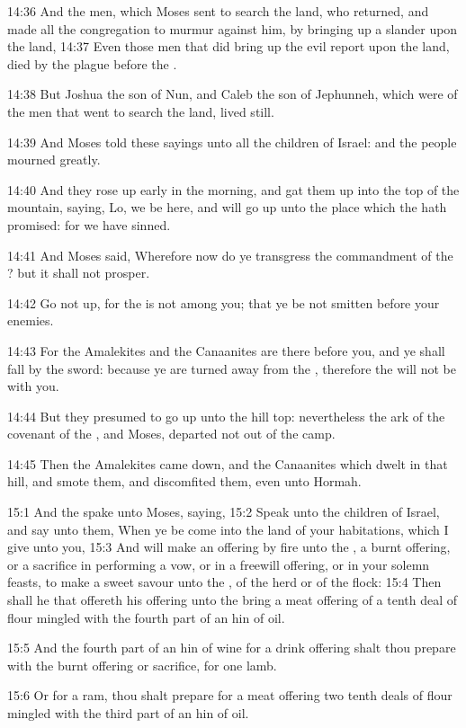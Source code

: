 14:36 And the men, which Moses sent to search the land, who returned,
and made all the congregation to murmur against him, by bringing up a
slander upon the land, 14:37 Even those men that did bring up the evil
report upon the land, died by the plague before the \LORD.

14:38 But Joshua the son of Nun, and Caleb the son of Jephunneh, which
were of the men that went to search the land, lived still.

14:39 And Moses told these sayings unto all the children of Israel:
and the people mourned greatly.

14:40 And they rose up early in the morning, and gat them up into the
top of the mountain, saying, Lo, we be here, and will go up unto the
place which the \LORD hath promised: for we have sinned.

14:41 And Moses said, Wherefore now do ye transgress the commandment
of the \LORD? but it shall not prosper.

14:42 Go not up, for the \LORD is not among you; that ye be not smitten
before your enemies.

14:43 For the Amalekites and the Canaanites are there before you, and
ye shall fall by the sword: because ye are turned away from the \LORD,
therefore the \LORD will not be with you.

14:44 But they presumed to go up unto the hill top: nevertheless the
ark of the covenant of the \LORD, and Moses, departed not out of the
camp.

14:45 Then the Amalekites came down, and the Canaanites which dwelt in
that hill, and smote them, and discomfited them, even unto Hormah.

15:1 And the \LORD spake unto Moses, saying, 15:2 Speak unto the
children of Israel, and say unto them, When ye be come into the land
of your habitations, which I give unto you, 15:3 And will make an
offering by fire unto the \LORD, a burnt offering, or a sacrifice in
performing a vow, or in a freewill offering, or in your solemn feasts,
to make a sweet savour unto the \LORD, of the herd or of the flock:
15:4 Then shall he that offereth his offering unto the \LORD bring a
meat offering of a tenth deal of flour mingled with the fourth part of
an hin of oil.

15:5 And the fourth part of an hin of wine for a drink offering shalt
thou prepare with the burnt offering or sacrifice, for one lamb.

15:6 Or for a ram, thou shalt prepare for a meat offering two tenth
deals of flour mingled with the third part of an hin of oil.

